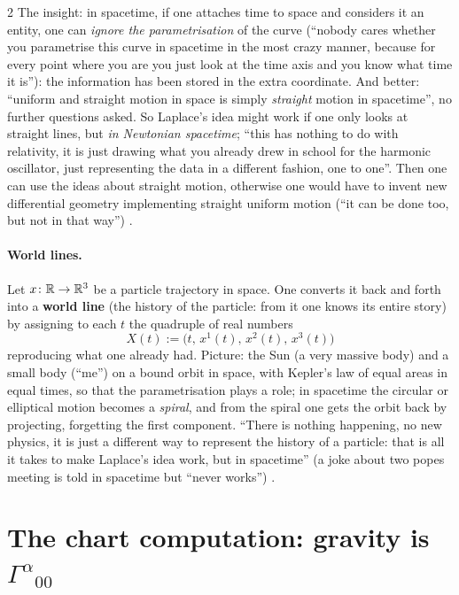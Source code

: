 \begin{paracol}{2}
The insight: in spacetime, if one attaches time to space and considers it an entity, one can \emph{ignore the parametrisation} of the curve (``nobody cares whether you parametrise this curve in spacetime in the most crazy manner, because for every point where you are you just look at the time axis and you know what time it is''): the information has been stored in the extra coordinate. And better: ``uniform and straight motion in space is simply \emph{straight} motion in spacetime'', no further questions asked. So Laplace's idea might work if one only looks at straight lines, but \emph{in Newtonian spacetime}; ``this has nothing to do with relativity, it is just drawing what you already drew in school for the harmonic oscillator, just representing the data in a different fashion, one to one''. Then one can use the ideas about straight motion, otherwise one would have to invent new differential geometry implementing straight uniform motion (``it can be done too, but not in that way'')
.

\paragraph{World lines.} Let $x\colon\mathbb{R}\to\mathbb{R}^3$ be a particle trajectory in space. One converts it back and forth into a \textbf{world line} (the history of the particle: from it one knows its entire story) by assigning to each $t$ the quadruple of real numbers
\[
  X(t):=\bigl(t,\,x^1(t),\,x^2(t),\,x^3(t)\bigr)
\]
reproducing what one already had. Picture: the Sun (a very massive body) and a small body (``me'') on a bound orbit in space, with Kepler's law of equal areas in equal times, so that the parametrisation plays a role; in spacetime the circular or elliptical motion becomes a \emph{spiral}, and from the spiral one gets the orbit back by projecting, forgetting the first component. ``There is nothing happening, no new physics, it is just a different way to represent the history of a particle: that is all it takes to make Laplace's idea work, but in spacetime'' (a joke about two popes meeting is told in spacetime but ``never works'') .

\section{The chart computation: gravity is $\Gamma^\alpha{}_{00}$}\label{sec:c09-chart}


\end{paracol}
